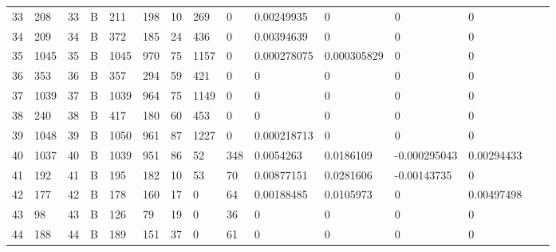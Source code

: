 \begin{longtable}{lllllllllllllll}
	33  & 208               & 33  & B   & 211               & 198               & 10                & 269  & 0          & 0.00249935     & 0              & 0             & 0            \\
	34  & 209               & 34  & B   & 372               & 185               & 24                & 436  & 0          & 0.00394639     & 0              & 0             & 0            \\
	35  & 1045              & 35  & B   & 1045              & 970               & 75                & 1157 & 0          & 0.000278075    & 0.000305829    & 0             & 0            \\
	36  & 353               & 36  & B   & 357               & 294               & 59                & 421  & 0          & 0              & 0              & 0             & 0            \\
	37  & 1039              & 37  & B   & 1039              & 964               & 75                & 1149 & 0          & 0              & 0              & 0             & 0            \\
	38  & 240               & 38  & B   & 417               & 180               & 60                & 453  & 0          & 0              & 0              & 0             & 0            \\
	39  & 1048              & 39  & B   & 1050              & 961               & 87                & 1227 & 0          & 0.000218713    & 0              & 0             & 0            \\
	40  & 1037              & 40  & B   & 1039              & 951               & 86                & 52   & 348        & 0.0054263      & 0.0186109      & -0.000295043  & 0.00294433   \\
	41  & 192               & 41  & B   & 195               & 182               & 10                & 53   & 70         & 0.00877151     & 0.0281606      & -0.00143735   & 0            \\
	42  & 177               & 42  & B   & 178               & 160               & 17                & 0    & 64         & 0.00188485     & 0.0105973      & 0             & 0.00497498   \\
	43  & 98                & 43  & B   & 126               & 79                & 19                & 0    & 36         & 0              & 0              & 0             & 0            \\
	44  & 188               & 44  & B   & 189               & 151               & 37                & 0    & 61         & 0              & 0              & 0             & 0            \\

\end{longtable}
